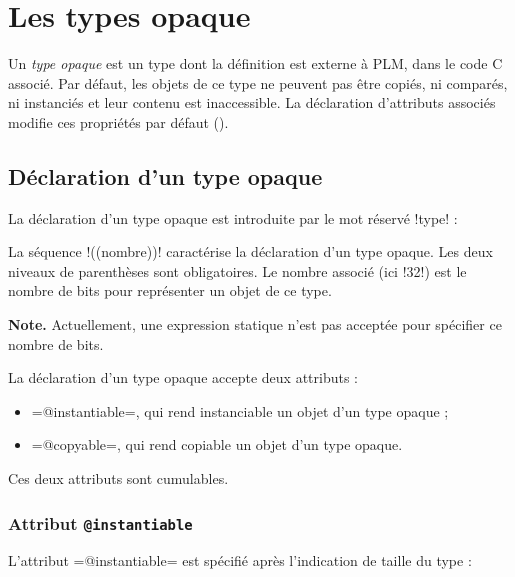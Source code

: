 




\chapter{Les types opaque}

Un \emph{type opaque} est un type dont la définition est externe à PLM, dans le code C associé. Par défaut, les objets de ce type ne peuvent pas être copiés, ni comparés, ni instanciés et leur contenu est inaccessible. La déclaration d'attributs associés modifie ces propriétés par défaut ().

\section{Déclaration d'un type opaque}

La déclaration d'un type opaque est introduite par le mot réservé \plm!type! :


La séquence \plm!((nombre))! caractérise la déclaration d'un type opaque. Les deux niveaux de parenthèses sont obligatoires. Le nombre associé (ici \plm!32!) est le nombre de bits pour représenter un objet de ce type.

{\bf Note.} Actuellement, une expression statique n'est pas acceptée pour spécifier ce nombre de bits. 


La déclaration d'un type opaque accepte deux attributs :
\begin{itemize}
\item \plm=@instantiable=, qui rend instanciable un objet d'un type opaque ;
\item \plm=@copyable=, qui rend copiable un objet d'un type opaque.
\end{itemize}

Ces deux attributs sont cumulables.

\subsection{Attribut \texttt{@instantiable}}

L'attribut \plm=@instantiable= est spécifié après l'indication de taille du type :


